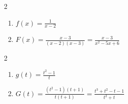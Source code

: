 \documentclass{ximera}
\begin{document}
\begin{multicols}{2}
\begin{enumerate}
\setcounter{enumi}{\value{HW}}

\item $f(x) = \frac{1}{x - 2}$
\item $F(x) = \frac{x-3}{(x-2)(x-3)} = \frac{x-3}{x^2-5x+6}$

\setcounter{HW}{\value{enumi}}
\end{enumerate}
\end{multicols}

\begin{multicols}{2}
\begin{enumerate}
\setcounter{enumi}{\value{HW}}


\item $g(t) =\frac{t^2-1}{t}$
\item $G(t) = \frac{(t^2-1)(t+1)}{t(t+1)} = \frac{t^3+t^2-t-1}{t^2+t}$


\setcounter{HW}{\value{enumi}}
\end{enumerate}
\end{multicols}
\end{document}
